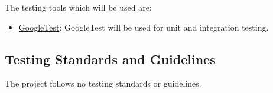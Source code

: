 The testing tools which will be used are:
\begin{itemize}
    \item \href{https://google.github.io/googletest/}{GoogleTest}: GoogleTest will be used for unit and integration testing.
\end{itemize}


\begin{comment}
We leverage the following tools, technologies, and systems in our testing process:

\begin{itemize}
\item \textbf{Testing Tools:} We utilize [Testing Tool/Platform Name, version] for [purpose], and it can be downloaded from [source].
\item \textbf{Bug Tracking Tools:} For tracking and managing defects, we use [Tool/Platform Name, version], which can be downloaded from [source].
\item \textbf{Test Management Tools:} We utilize [Tool/Platform Name, version] for [purpose], and it can be downloaded from [source].
\item \textbf{Operating Systems:} We primarily operate on [Operating System name and version]. Please align your system with the same for consistency and compatibility. If your system operates differently, notify the team for assistance with potential compatibility issues.
\end{itemize}

Please install the correct version numbers as specified for consistency and compatibility.
\end{comment}

\subsection{Testing Standards and Guidelines}

The project follows no testing standards or guidelines.



